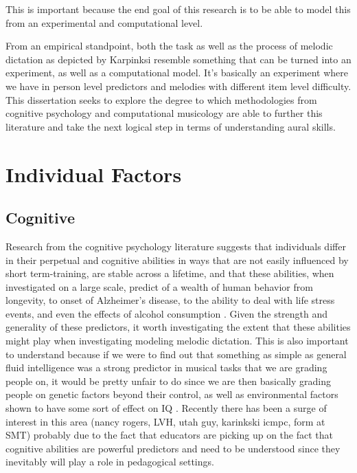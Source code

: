 \documentclass[]{book}
\theoremstyle{definition}
\theoremstyle{definition}
\theoremstyle{definition}
\theoremstyle{remark}
\begin{document}
This is important because the end goal of this research is to be able to
model this from an experimental and computational level.

From an empirical standpoint, both the task as well as the process of
melodic dictation as depicted by Karpinksi resemble something that can
be turned into an experiment, as well as a computational model. It's
basically an experiment where we have in person level predictors and
melodies with different item level difficulty. This dissertation seeks
to explore the degree to which methodologies from cognitive psychology
and computational musicology are able to further this literature and
take the next logical step in terms of understanding aural skills.

\hypertarget{individual-factors}{%
\section{Individual Factors}\label{individual-factors}}

\hypertarget{cognitive}{%
\subsection{Cognitive}\label{cognitive}}

Research from the cognitive psychology literature suggests that
individuals differ in their perpetual and cognitive abilities in ways
that are not easily influenced by short term-training, are stable across
a lifetime, and that these abilities, when investigated on a large
scale, predict of a wealth of human behavior from longevity, to onset of
Alzheimer's disease, to the ability to deal with life stress events, and
even the effects of alcohol consumption
\citep{ritchieIntelligenceAllThat2015, unsworthAutomatedVersionOperation2005}.
Given the strength and generality of these predictors, it worth
investigating the extent that these abilities might play when
investigating modeling melodic dictation. This is also important to
understand because if we were to find out that something as simple as
general fluid intelligence was a strong predictor in musical tasks that
we are grading people on, it would be pretty unfair to do since we are
then basically grading people on genetic factors beyond their control,
as well as environmental factors shown to have some sort of effect on IQ
\citep{ritchieIntelligenceAllThat2015}. Recently there has been a surge
of interest in this area (nancy rogers, LVH, utah guy, karinkski icmpc,
form at SMT) probably due to the fact that educators are picking up on
the fact that cognitive abilities are powerful predictors and need to be
understood since they inevitably will play a role in pedagogical
settings.
\end{document}
